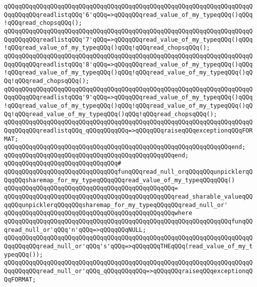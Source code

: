 \verb|qQQqqQQqqQQqqQQqqQQqqQQqqQQqqQQqqQQqqQQqqQQqqQQqqQQqqQQqqQQqqQQqqQQqqQQqqQQqqQQqreadlistqQQq'6'qQQq=>qQQqqQQqread_value_of_my_typeqQQq()qQQq!qQQqread_chopsqQQq();|\newline
\verb|qQQqqQQqqQQqqQQqqQQqqQQqqQQqqQQqqQQqqQQqqQQqqQQqqQQqqQQqqQQqqQQqqQQqqQQqqQQqqQQqreadlistqQQq'7'qQQq=>qQQqqQQqread_value_of_my_typeqQQq()qQQq!qQQqread_value_of_my_typeqQQq()qQQq!qQQqread_chopsqQQq();|\newline
\verb|qQQqqQQqqQQqqQQqqQQqqQQqqQQqqQQqqQQqqQQqqQQqqQQqqQQqqQQqqQQqqQQqqQQqqQQqqQQqqQQqreadlistqQQq'8'qQQq=>qQQqqQQqread_value_of_my_typeqQQq()qQQq!qQQqread_value_of_my_typeqQQq()qQQq!qQQqread_value_of_my_typeqQQq()qQQq!qQQqread_chopsqQQq();|\newline
\verb|qQQqqQQqqQQqqQQqqQQqqQQqqQQqqQQqqQQqqQQqqQQqqQQqqQQqqQQqqQQqqQQqqQQqqQQqqQQqqQQqreadlistqQQq'9'qQQq=>qQQqqQQqread_value_of_my_typeqQQq()qQQq!qQQqread_value_of_my_typeqQQq()qQQq!qQQqread_value_of_my_typeqQQq()qQQq!qQQqread_value_of_my_typeqQQq()qQQq!qQQqread_chopsqQQq();|\newline
\verb|qQQqqQQqqQQqqQQqqQQqqQQqqQQqqQQqqQQqqQQqqQQqqQQqqQQqqQQqqQQqqQQqqQQqqQQqqQQqqQQqreadlistqQQq_qQQqqQQqqQQq=>qQQqqQQqraiseqQQqexceptionqQQqFORMAT;|\newline
\verb|qQQqqQQqqQQqqQQqqQQqqQQqqQQqqQQqqQQqqQQqqQQqqQQqqQQqqQQqqQQqqQQqend;|\newline
\verb|qQQqqQQqqQQqqQQqqQQqqQQqqQQqqQQqqQQqqQQqqQQqqQQqend;|\newline
\verb|qQQqqQQqqQQqqQQqqQQqqQQqqQQqqQQq#|\newline
\verb|qQQqqQQqqQQqqQQqqQQqqQQqqQQqqQQqfunqQQqread_null_orqQQqqQQqunpicklerqQQqqQQqsharemap_for_my_typeqQQqqQQqread_value_of_my_typeqQQqqQQq()|\newline
\verb|qQQqqQQqqQQqqQQqqQQqqQQqqQQqqQQqqQQqqQQqqQQqqQQq=|\newline
\verb|qQQqqQQqqQQqqQQqqQQqqQQqqQQqqQQqqQQqqQQqqQQqqQQqread_sharable_valueqQQqqQQqunpicklerqQQqqQQqsharemap_for_my_typeqQQqqQQqread_null_or'|\newline
\verb|qQQqqQQqqQQqqQQqqQQqqQQqqQQqqQQqqQQqqQQqqQQqqQQqwhere|\newline
\verb|qQQqqQQqqQQqqQQqqQQqqQQqqQQqqQQqqQQqqQQqqQQqqQQqqQQqqQQqqQQqqQQqfunqQQqread_null_or'qQQq'n'qQQq=>qQQqqQQqNULL;|\newline
\verb|qQQqqQQqqQQqqQQqqQQqqQQqqQQqqQQqqQQqqQQqqQQqqQQqqQQqqQQqqQQqqQQqqQQqqQQqqQQqqQQqread_null_or'qQQq's'qQQq=>qQQqqQQqTHEqQQq(read_value_of_my_typeqQQq());|\newline
\verb|qQQqqQQqqQQqqQQqqQQqqQQqqQQqqQQqqQQqqQQqqQQqqQQqqQQqqQQqqQQqqQQqqQQqqQQqqQQqqQQqread_null_or'qQQq_qQQqqQQqqQQq=>qQQqqQQqraiseqQQqexceptionqQQqFORMAT;|\newline
